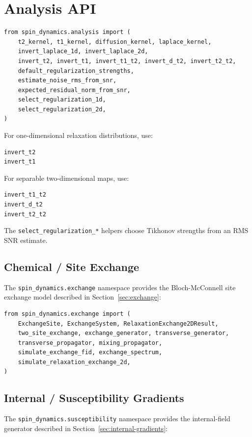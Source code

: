 \documentclass[11pt,oneside]{report}
\newcommand{\code}[1]{\texttt{#1}}
\begin{document}
\section{Analysis API}

\begin{lstlisting}
from spin_dynamics.analysis import (
    t2_kernel, t1_kernel, diffusion_kernel, laplace_kernel,
    invert_laplace_1d, invert_laplace_2d,
    invert_t2, invert_t1, invert_t1_t2, invert_d_t2, invert_t2_t2,
    default_regularization_strengths,
    estimate_noise_rms_from_snr,
    expected_residual_norm_from_snr,
    select_regularization_1d,
    select_regularization_2d,
)
\end{lstlisting}

For one-dimensional relaxation distributions, use:

\begin{lstlisting}
invert_t2
invert_t1
\end{lstlisting}

For separable two-dimensional maps, use:

\begin{lstlisting}
invert_t1_t2
invert_d_t2
invert_t2_t2
\end{lstlisting}

The \code{select\_regularization\_*} helpers choose Tikhonov strengths from an
RMS SNR estimate.

\subsection{Chemical / Site Exchange}

The \code{spin\_dynamics.exchange} namespace provides the Bloch-McConnell site
exchange model described in Section~\ref{sec:exchange}:

\begin{lstlisting}
from spin_dynamics.exchange import (
    ExchangeSite, ExchangeSystem, RelaxationExchange2DResult,
    two_site_exchange, exchange_generator, transverse_generator,
    transverse_propagator, mixing_propagator,
    simulate_exchange_fid, exchange_spectrum,
    simulate_relaxation_exchange_2d,
)
\end{lstlisting}

\subsection{Internal / Susceptibility Gradients}

The \code{spin\_dynamics.susceptibility} namespace provides the internal-field
generator described in Section~\ref{sec:internal-gradients}:
\end{document}
